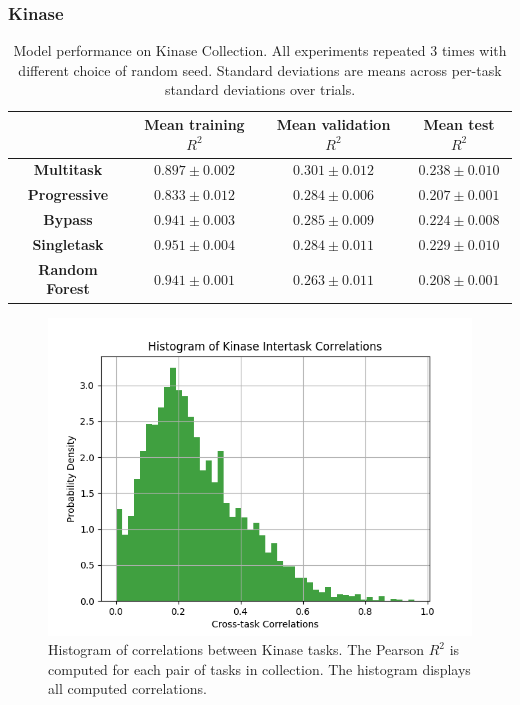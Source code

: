 \subsubsection{Kinase}
\begin{table}[H]
    \centering
    \begin{tabular}{ |c|c|c|c| } 
    \hline
     & Mean training $R^2$ & Mean validation $R^2$ & Mean test $R^2$ \\ 
    \hline
    \textbf{Multitask} & $0.897 \pm 0.002$ & $0.301 \pm 0.012$ & $0.238 \pm 0.010$  \\
    \hline
    \textbf{Progressive} & $0.833 \pm 0.012$ & $0.284 \pm 0.006$ & $0.207 \pm 0.001$  \\
    \hline
    \textbf{Bypass} & $0.941 \pm 0.003$ & $0.285 \pm 0.009$ & $0.224 \pm 0.008$  \\
    \hline
    \textbf{Singletask} & $0.951 \pm 0.004$ & $0.284 \pm 0.011$ & $0.229 \pm 0.010$  \\
    \hline
    \textbf{Random Forest} & $0.941 \pm 0.001$ & $0.263 \pm 0.011$ & $0.208 \pm 0.001$  \\
    \hline
    \end{tabular}
    \caption{Model performance on Kinase Collection. All experiments repeated 3 times with different choice of random seed. Standard deviations are means across per-task standard deviations over trials.}
    \label{tab:kinase}
\end{table}
\begin{figure}[H]
  \includegraphics[width=.75\textwidth]{Images/Kinase_correlations.png}
  \caption{Histogram of correlations between Kinase tasks. The Pearson $R^2$ is computed for each pair of tasks in collection. The histogram displays all computed correlations.}
  \label{fig:kinase-corrs}
\end{figure}
